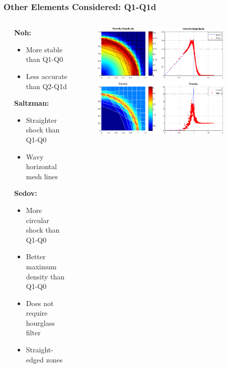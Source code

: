 \documentclass[8pt,xcolor=svgnames]{beamer}
\begin{document}
\begin{frame}
 \frametitle{Other Elements Considered: Q1-Q1d}
 \begin{columns}[T]
\begin{column}{0.02\textwidth}
\end{column}
  \begin{column}{0.24\textwidth}
  \bigskip
\textbf{Noh:}
   \begin{itemize}
    \item More stable than Q1-Q0
    \item Less accurate than Q2-Q1d
   \end{itemize}
\textbf{Saltzman:}
   \begin{itemize}
    \item Straighter shock than Q1-Q0
    \item Wavy horizontal mesh lines
   \end{itemize}
\textbf{Sedov:}
   \begin{itemize}
    \item More circular shock than Q1-Q0
    \item Better maximum density than Q1-Q0
    \item Does not require hourglass filter
    \item Straight-edged zones
   \end{itemize}
  \end{column}
  \begin{column}{0.8\textwidth}
   \begin{figure}[h!]
    \centering
    \includegraphics[width=0.9\textwidth,keepaspectratio=true]{./Images/Sedov_Q1Q1_10x10.png}
    \end{figure}
  \end{column}
 \end{columns}
\end{frame}
\end{document}

